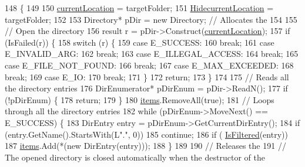 \begin{DoxyCode}
148                                                             \{
149 
150     \hyperlink{class_folder_browser_a1f7bc249da2f28c6a03759a983eacf75}{currentLocation} = targetFolder;
151     \hyperlink{class_folder_browser_acfb2670184ff88e3b06e2562d02983ce}{HidecurrentLocation} = targetFolder;
152 
153     Directory* pDir = \textcolor{keyword}{new} Directory; \textcolor{comment}{// Allocates the %
154 
155     \textcolor{comment}{// Open the directory}
156     result r = pDir->Construct(\hyperlink{class_folder_browser_a1f7bc249da2f28c6a03759a983eacf75}{currentLocation});
157     \textcolor{keywordflow}{if} (IsFailed(r)) \{
158         \textcolor{keywordflow}{switch} (r) \{
159         \textcolor{keywordflow}{case} E\_SUCCESS:
160             \textcolor{keywordflow}{break};
161         \textcolor{keywordflow}{case} E\_INVALID\_ARG:
162             \textcolor{keywordflow}{break};
163         \textcolor{keywordflow}{case} E\_ILLEGAL\_ACCESS:
164             \textcolor{keywordflow}{break};
165         \textcolor{keywordflow}{case} E\_FILE\_NOT\_FOUND:
166             \textcolor{keywordflow}{break};
167         \textcolor{keywordflow}{case} E\_MAX\_EXCEEDED:
168             \textcolor{keywordflow}{break};
169         \textcolor{keywordflow}{case} E\_IO:
170             \textcolor{keywordflow}{break};
171         \}
172         \textcolor{keywordflow}{return};
173     \}
174 
175     \textcolor{comment}{// Reads all the directory entries}
176     DirEnumerator* pDirEnum = pDir->ReadN();
177     \textcolor{keywordflow}{if} (!pDirEnum) \{
178         \textcolor{keywordflow}{return};
179     \}
180     \hyperlink{class_folder_browser_ae88620740bd179b78a573f1db28c50ba}{items}.RemoveAll(\textcolor{keyword}{true});
181     \textcolor{comment}{// Loops through all the directory entries}
182     \textcolor{keywordflow}{while} (pDirEnum->MoveNext() == E\_SUCCESS) \{
183         DirEntry entry = pDirEnum->GetCurrentDirEntry();
184         \textcolor{keywordflow}{if} (entry.GetName().StartsWith(L\textcolor{stringliteral}{"."}, 0))
185             \textcolor{keywordflow}{continue};
186         \textcolor{keywordflow}{if} ( \hyperlink{class_folder_browser_a24d476da0efca9d46c266108d9e33d88}{IsFiltered}(entry))
187             \hyperlink{class_folder_browser_ae88620740bd179b78a573f1db28c50ba}{items}.Add(*(\textcolor{keyword}{new} DirEntry(entry)));
188     \}
189 
190     \textcolor{comment}{// Releases the %
191     \textcolor{comment}{// The opened directory is closed automatically when the destructor of the %
}}}
\end{DoxyCode}
